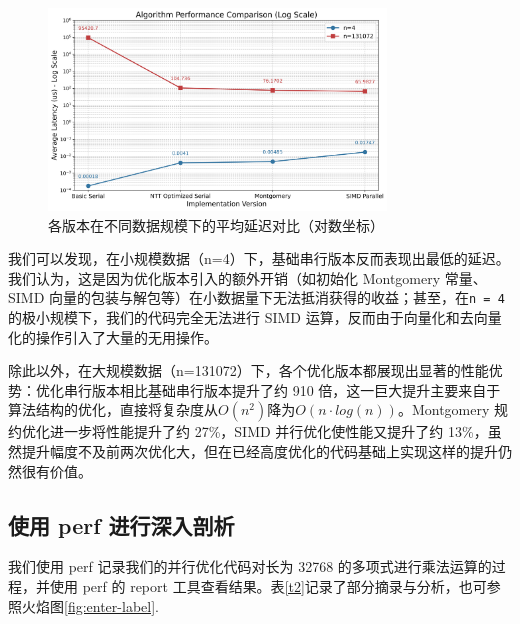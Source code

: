\documentclass[a4paper]{article}
\begin{document}
\begin{figure}[h]
    \centering
    \includegraphics[width=0.8\textwidth]{image/2.png}
    \caption{各版本在不同数据规模下的平均延迟对比（对数坐标）}
    \label{\p1}
\end{figure}

我们可以发现，在小规模数据（n=4）下，基础串行版本反而表现出最低的延迟。我们认为，这是因为优化版本引入的额外开销（如初始化 Montgomery 常量、SIMD 向量的包装与解包等）在小数据量下无法抵消获得的收益；甚至，在\texttt{n = 4}的极小规模下，我们的代码完全无法进行 SIMD 运算，反而由于向量化和去向量化的操作引入了大量的无用操作。

除此以外，在大规模数据（n=131072）下，各个优化版本都展现出显著的性能优势：优化串行版本相比基础串行版本提升了约 910 倍，这一巨大提升主要来自于算法结构的优化，直接将复杂度从$O(n^2)$降为$O(n\cdot log(n))$。Montgomery 规约优化进一步将性能提升了约 27\%，SIMD 并行优化使性能又提升了约 13\%，虽然提升幅度不及前两次优化大，但在已经高度优化的代码基础上实现这样的提升仍然很有价值。

\subsection{使用 perf 进行深入剖析}

我们使用 perf 记录我们的并行优化代码对长为 32768 的多项式进行乘法运算的过程，并使用 perf 的 report 工具查看结果。表\ref{t2}记录了部分摘录与分析，也可参照火焰图\ref{fig:enter-label}.
\end{document}
